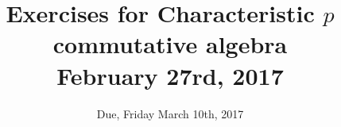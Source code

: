 \documentclass[12pt]{amsart}
\numberwithin{equation}{theorem}
\renewcommand{\:}{\colon}
\theoremstyle{theorem}
\begin{document}
\title{Exercises for Characteristic $p$ commutative algebra\\February 27rd, 2017}
\author{Due, Friday March 10th, 2017}



\maketitle

%
%
\end{document}
